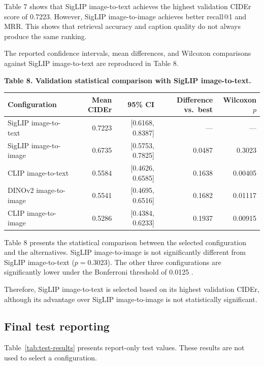 \documentclass{article}
\begin{document}
Table 7 shows that SigLIP image-to-text achieves the highest
validation CIDEr score of 0.7223. However, SigLIP image-to-image
achieves better recall@1 and MRR. This shows that retrieval
accuracy and caption quality do not always produce the same ranking.

The reported confidence intervals, mean differences, and Wilcoxon
comparisons against SigLIP image-to-text are reproduced in Table 8.

\begin{center}
\textbf{Table 8. Validation statistical comparison with SigLIP
image-to-text.}
\end{center}

\begin{table}[htbp]
\centering
\begin{tabular}{lrrrr}
\toprule
Configuration & Mean CIDEr & 95\% CI & Difference vs.\ best & Wilcoxon \(p\) \\
\midrule
SigLIP image-to-text & 0.7223 & [0.6168, 0.8387] & --- & --- \\
SigLIP image-to-image & 0.6735 & [0.5753, 0.7825] & 0.0487 & 0.3023 \\
CLIP image-to-text & 0.5584 & [0.4626, 0.6585] & 0.1638 & 0.00405 \\
DINOv2 image-to-image & 0.5541 & [0.4695, 0.6516] & 0.1682 & 0.01117 \\
CLIP image-to-image & 0.5286 & [0.4384, 0.6233] & 0.1937 & 0.00915 \\
\bottomrule
\end{tabular}
\end{table}

Table 8 presents the statistical comparison between the selected
configuration and the alternatives. SigLIP image-to-image is not
significantly different from SigLIP image-to-text
(\(p=0.3023\)). The other three configurations are significantly
lower under the Bonferroni threshold of 0.0125 \cite{cohen_statistical_2013}.

Therefore, SigLIP image-to-text is selected based on its highest
validation CIDEr, although its advantage over SigLIP image-to-image
is not statistically significant.

\subsection{Final test reporting}\label{final-test-reporting}

Table~\ref{tab:test-results} presents report-only test values.
These results are not used to select a configuration.
\end{document}
